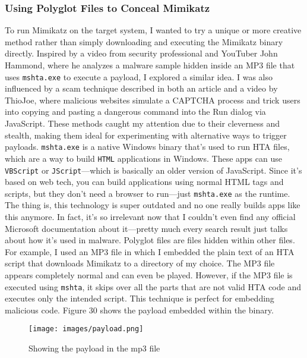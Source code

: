 \documentclass[a4paper]{article}
\newcommand{\abc}{\hfill \break}
\begin{document}
\subsubsection{Using Polyglot Files to Conceal Mimikatz}
To run Mimikatz on the target system, I wanted to try a unique or more creative method rather than simply downloading and executing the Mimikatz binary directly. Inspired by a video from security professional and YouTuber John Hammond, where he analyzes a malware sample hidden inside an MP3 file that uses \texttt{mshta.exe} to execute a payload, I explored a similar idea. I was also influenced by a scam technique described in both an article and a video by ThioJoe, where malicious websites simulate a CAPTCHA process and trick users into copying and pasting a dangerous command into the Run dialog via JavaScript. These methods caught my attention due to their cleverness and stealth, making them ideal for experimenting with alternative ways to trigger payloads. \cite{john_hammond_this_2025, mshta-phising, theo-joe-new-scams}\abc
\texttt{mshta.exe} is a native Windows binary that’s used to run HTA files, which are a way to build \texttt{HTML} applications in Windows. These apps can use \texttt{VBScript} or \texttt{JScript}—which is basically an older version of JavaScript. Since it’s based on web tech, you can build applications using normal HTML tags and scripts, but they don’t need a browser to run—just \texttt{mshta.exe} as the runtime. The thing is, this technology is super outdated and no one really builds apps like this anymore. In fact, it’s so irrelevant now that I couldn’t even find any official Microsoft documentation about it—pretty much every search result just talks about how it’s used in malware. \cite{hta-apps}\abc
Polyglot files are files hidden within other files. For example, I used an MP3 file in which I embedded the plain text of an HTA script that downloads Mimikatz to a directory of my choice. The MP3 file appears completely normal and can even be played. However, if the MP3 file is executed using \texttt{mshta}, it skips over all the parts that are not valid HTA code and executes only the intended script. This technique is perfect for embedding malicious code. \cite{john_hammond_this_2025, polyglot-files}\abc
Figure 30 shows the payload embedded within the binary.
\begin{figure}[h]
	\texttt{[image: images/payload.png]}
	\centering
	\caption{Showing the payload in the mp3 file}
\end{figure}\abc
\end{document}
